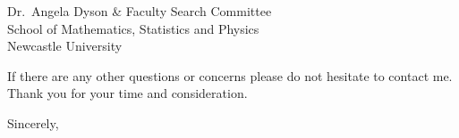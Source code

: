 \documentclass[12pt]{letter}
\begin{document}
\begin{letter}{
        Dr.~Angela Dyson \& Faculty Search Committee \\
        School of Mathematics, Statistics and Physics \\
        Newcastle University}
    
    If there are any other questions or concerns please do not hesitate to contact me.
    Thank you for your time and consideration.

\closing{Sincerely,}
\vspace{-0.9in}
\\
\end{letter}
\end{document}

